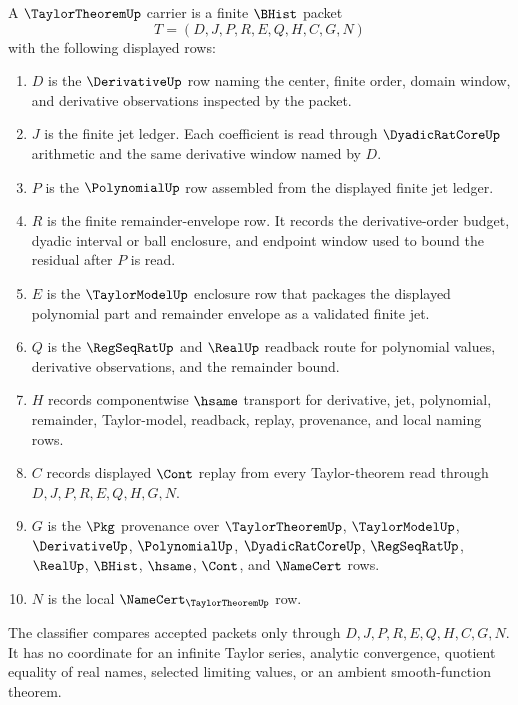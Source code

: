 \begin{definition}
\label{def:taylor-theorem-carrier}
A $\TaylorTheoremUp$ carrier is a finite $\BHist$ packet
$$
T=(D,J,P,R,E,Q,H,C,G,N)
$$
with the following displayed rows:
\begin{enumerate}
\item $D$ is the $\DerivativeUp$ row naming the center, finite order, domain window, and derivative observations inspected by the packet.
\item $J$ is the finite jet ledger. Each coefficient is read through $\DyadicRatCoreUp$ arithmetic and the same derivative window named by $D$.
\item $P$ is the $\PolynomialUp$ row assembled from the displayed finite jet ledger.
\item $R$ is the finite remainder-envelope row. It records the derivative-order budget, dyadic interval or ball enclosure, and endpoint window used to bound the residual after $P$ is read.
\item $E$ is the $\TaylorModelUp$ enclosure row that packages the displayed polynomial part and remainder envelope as a validated finite jet.
\item $Q$ is the $\RegSeqRatUp$ and $\RealUp$ readback route for polynomial values, derivative observations, and the remainder bound.
\item $H$ records componentwise $\hsame$ transport for derivative, jet, polynomial, remainder, Taylor-model, readback, replay, provenance, and local naming rows.
\item $C$ records displayed $\Cont$ replay from every Taylor-theorem read through $D,J,P,R,E,Q,H,G,N$.
\item $G$ is the $\Pkg$ provenance over $\TaylorTheoremUp$, $\TaylorModelUp$, $\DerivativeUp$, $\PolynomialUp$, $\DyadicRatCoreUp$, $\RegSeqRatUp$, $\RealUp$, $\BHist$, $\hsame$, $\Cont$, and $\NameCert$ rows.
\item $N$ is the local $\NameCert_{\TaylorTheoremUp}$ row.
\end{enumerate}
The classifier compares accepted packets only through $D,J,P,R,E,Q,H,C,G,N$. It has no coordinate for an infinite Taylor series, analytic convergence, quotient equality of real names, selected limiting values, or an ambient smooth-function theorem.
\end{definition}

